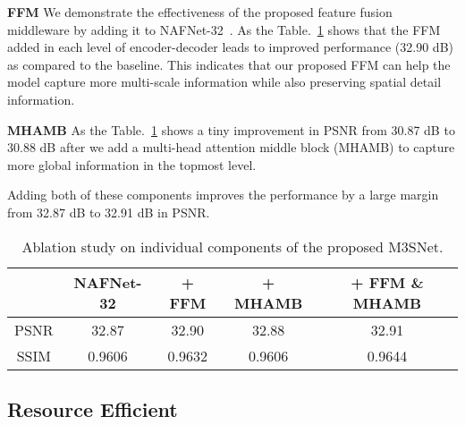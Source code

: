 \documentclass[sn-mathphys,Numbered]{sn-jnl}
\theoremstyle{thmstyleone}\newtheorem{theorem}{Theorem}\newtheorem{proposition}[theorem]{Proposition}
\theoremstyle{thmstyletwo}\newtheorem{example}{Example}\newtheorem{remark}{Remark}
\theoremstyle{thmstylethree}\newtheorem{definition}{Definition}
\begin{document}
\textbf{FFM}
We demonstrate the effectiveness of the proposed feature fusion middleware by adding it to NAFNet-32~\cite{chen2022simple}. As the Table.~\ref{tb:03} shows that the FFM added in each level of encoder-decoder leads to improved performance (32.90 dB) as compared to the baseline. This indicates that our proposed FFM can help the model capture more multi-scale information while also preserving spatial detail information.

\textbf{MHAMB} As the Table.~\ref{tb:03} shows a tiny improvement in PSNR from 30.87 dB to 30.88 dB after we add a multi-head attention middle block (MHAMB) to capture more global information in the topmost level. 

Adding both of these components improves the performance by a large margin from 32.87 dB to 32.91 dB in PSNR.


\begin{table}

\caption{Ablation study on individual components of the
proposed M3SNet. \label{tb:03}}
\begin{tabular}{ccccc}
\hline  
\multicolumn{1}{c}{ } & \multicolumn{1}{c}{NAFNet-32} & \multicolumn{1}{c}{+ FFM} & \multicolumn{1}{c}{+ MHAMB} & \multicolumn{1}{c}{+ FFM \& MHAMB}
  \\
\hline\hline
\multicolumn{1}{c}{PSNR} & \multicolumn{1}{c}{32.87} & \multicolumn{1}{c}{32.90} & \multicolumn{1}{c}{32.88} & \multicolumn{1}{c}{32.91}
\\
\multicolumn{1}{c}{SSIM} & \multicolumn{1}{c}{0.9606} & \multicolumn{1}{c}{0.9632} & \multicolumn{1}{c}{0.9606} & \multicolumn{1}{c}{0.9644}
\\
\hline
\end{tabular}

\end{table}


\subsection{Resource Efficient}
\end{document}
